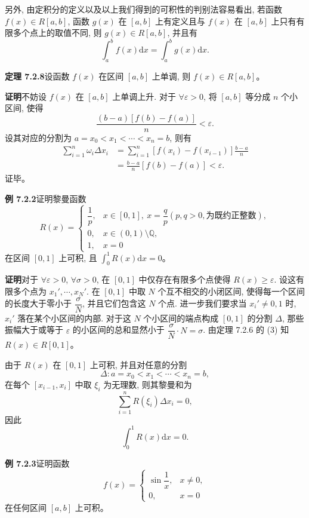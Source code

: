 \documentclass[UTF8, 12pt, fontset=fandol, oneside]{ctexart}
\begin{document}
另外, 由定积分的定义以及以上我们得到的可积性的判别法容易看出, 若函数 $f(x)\in R[a,b]$, 函数 $g(x)$ 在 $[a,b]$ 上有定义且与 $f(x)$ 在 $[a,b]$ 上只有有限多个点上的取值不同, 则 $g(x)\in R[a,b]$, 并且有
\[
  \int_a^b f(x)\mathrm dx=\int_a^b g(x)\mathrm dx.
\]

\noindent\textbf{定理 7.2.8}\quad 设函数 $f(x)$ 在区间 $[a,b]$ 上单调, 则 $f(x)\in R[a,b]$。

\noindent\textbf{证明}\quad 不妨设 $f(x)$ 在 $[a,b]$ 上单调上升. 对于 $\forall\varepsilon>0$, 将 $[a,b]$ 等分成 $n$ 个小区间, 使得
\[
  \frac{(b-a)[f(b)-f(a)]}{n}<\varepsilon.
\]
设其对应的分割为 $a=x_0<x_1<\cdots<x_n=b$, 则有
\[
\begin{aligned}
  \sum_{i=1}^n \omega_i\Delta x_i
  &=\sum_{i=1}^n [f(x_i)-f(x_{i-1})]\frac{b-a}{n}\\
  &=\frac{b-a}{n}[f(b)-f(a)]<\varepsilon.
\end{aligned}
\]
证毕。

\noindent\textbf{例 7.2.2}\quad 证明黎曼函数
\[
R(x)=
\begin{cases}
  \dfrac{1}{p}, & x\in[0,1],\ x=\dfrac{q}{p}(p,q>0,\text{为既约正整数}),\\
  0, & x\in(0,1)\setminus\mathbb Q,\\
  1, & x=0
\end{cases}
\]
在区间 $[0,1]$ 上可积, 且 $\int_0^1 R(x)\mathrm dx=0$。

\noindent\textbf{证明}\quad 对于 $\forall\varepsilon>0$, $\forall\sigma>0$, 在 $[0,1]$ 中仅存在有限多个点使得 $R(x)\geq\varepsilon$. 设这有限多个点为 $x_1',\cdots,x_N'$. 在 $[0,1]$ 中取 $N$ 个互不相交的小闭区间, 使得每一个区间的长度大于零小于 $\dfrac{\sigma}{N}$, 并且它们包含这 $N$ 个点. 进一步我们要求当 $x_i'\neq0,1$ 时, $x_i'$ 落在某个小区间的内部. 对于这 $N$ 个小区间的端点构成 $[0,1]$ 的分割 $\Delta$, 那些振幅大于或等于 $\varepsilon$ 的小区间的总和显然小于 $\dfrac{\sigma}{N}\cdot N=\sigma$. 由定理 7.2.6 的 (3) 知 $R(x)\in R[0,1]$。

由于 $R(x)$ 在 $[0,1]$ 上可积, 并且对任意的分割
\[
  \Delta:a=x_0<x_1<\cdots<x_n=b,
\]
在每个 $[x_{i-1},x_i]$ 中取 $\xi_i$ 为无理数, 则其黎曼和为
\[
  \sum_{i=1}^n R(\xi_i)\Delta x_i=0,
\]
因此
\[
  \int_0^1 R(x)\mathrm dx=0.
\]

\noindent\textbf{例 7.2.3}\quad 证明函数
\[
f(x)=
\begin{cases}
  \sin\dfrac{1}{x}, & x\neq0,\\
  0, & x=0
\end{cases}
\]
在任何区间 $[a,b]$ 上可积。
\end{document}
